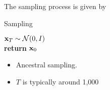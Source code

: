 The sampling process is given by
\begin{algorithm}[h]
	\caption{Sampling}
	\label{alg:diffusion_sampling}
		${\mathbf{x}}_T\sim \mathcal{N}(0,I)$\\
		\textbf{return } ${\mathbf{x}}_0$
\end{algorithm}
\begin{itemize}
	\item Ancestral sampling.
	\item $T$ is typically around 1,000
\end{itemize}
	
